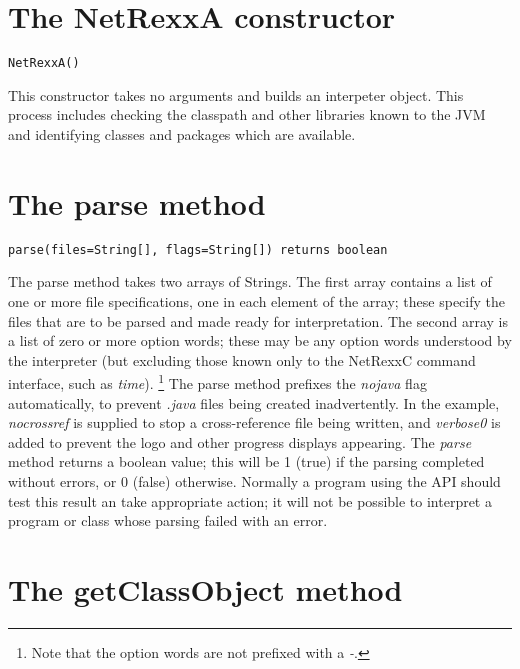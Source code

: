 \section{The NetRexxA constructor}

\begin{lstlisting}[label=constructor,caption=Constructor]
NetRexxA()
\end{lstlisting}
This constructor takes no arguments and builds an interpeter object.
This process includes checking the classpath and other libraries known
to the JVM and identifying classes and packages which are available.
\section{The parse method}
\begin{lstlisting}[label=parse,caption=parse]
parse(files=String[], flags=String[]) returns boolean
\end{lstlisting}

The parse method takes two arrays of Strings.  The first array contains
a list of one or more file specifications, one in each element of the
array; these specify the files that are to be parsed and made ready for
interpretation.
\newline
The second array is a list of zero or more option words; these may be
any option words understood by the interpreter (but excluding those
known only to the NetRexxC command interface, such as \emph{time}).
\footnote{Note that the option words are not prefixed with a \emph{-}.}
The parse method prefixes the \emph{nojava} flag automatically, to
prevent \emph{.java} files being created inadvertently.  In the
example, \emph{nocrossref} is supplied to stop a cross-reference file
being written, and \emph{verbose0} is added to prevent the logo and
other progress displays appearing.
\newline
The \emph{parse} method returns a boolean value; this will be 1 (true)
if the parsing completed without errors, or 0 (false) otherwise.
Normally a program using the API should test this result an take
appropriate action; it will not be possible to interpret a program or
class whose parsing failed with an error.

\section{The getClassObject method}

